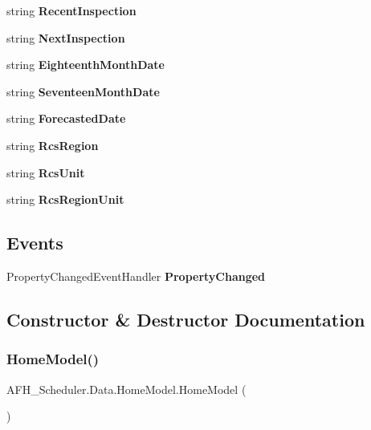 \begin{DoxyCompactItemize}
\item 
string \textbf{ Recent\+Inspection}\hspace{0.3cm}{\ttfamily  [get, set]}
\item 
string \textbf{ Next\+Inspection}\hspace{0.3cm}{\ttfamily  [get, set]}
\item 
string \textbf{ Eighteenth\+Month\+Date}\hspace{0.3cm}{\ttfamily  [get, set]}
\item 
string \textbf{ Seventeen\+Month\+Date}\hspace{0.3cm}{\ttfamily  [get, set]}
\item 
string \textbf{ Forecasted\+Date}\hspace{0.3cm}{\ttfamily  [get, set]}
\item 
string \textbf{ Rcs\+Region}\hspace{0.3cm}{\ttfamily  [get, set]}
\item 
string \textbf{ Rcs\+Unit}\hspace{0.3cm}{\ttfamily  [get, set]}
\item 
string \textbf{ Rcs\+Region\+Unit}\hspace{0.3cm}{\ttfamily  [get, set]}
\end{DoxyCompactItemize}
\subsection*{Events}
\begin{DoxyCompactItemize}
\item 
Property\+Changed\+Event\+Handler \textbf{ Property\+Changed}
\end{DoxyCompactItemize}


\subsection{Constructor \& Destructor Documentation}
\mbox{\label{class_a_f_h___scheduler_1_1_data_1_1_home_model_a8648ff68319f1777254f99504cdb6a7d}} 
\subsubsection{HomeModel()}
{\footnotesize\ttfamily A\+F\+H\+\_\+\+Scheduler.\+Data.\+Home\+Model.\+Home\+Model (\begin{DoxyParamCaption}{ }\end{DoxyParamCaption})}



